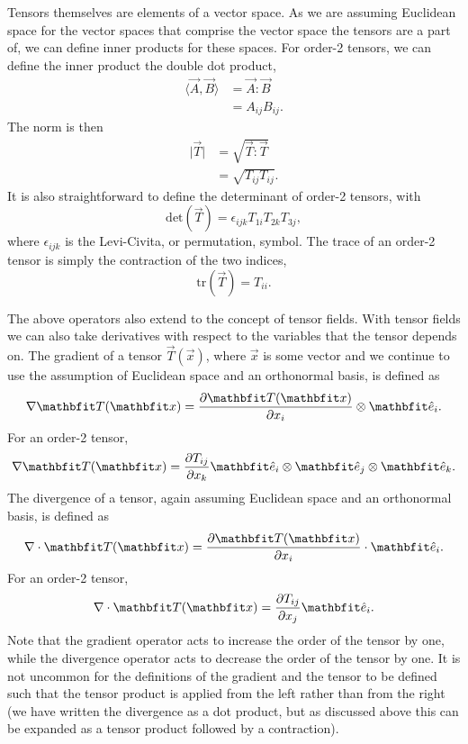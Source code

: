 Tensors themselves are elements of a vector space.
As we are assuming Euclidean space for the vector spaces that comprise the vector space the tensors are a part of, we can define inner products for these spaces.
For order-2 tensors, we can define the inner product the double dot product,
\begin{align}
    \langle \vec{A}, \vec{B} \rangle &= \vec{A} : \vec{B} \nonumber\\
                                     &= A_{ij} B_{ij}.
\end{align}
The norm is then
\begin{align}
    \lvert \vec{T} \rvert &= \sqrt{\vec{T} : \vec{T}} \nonumber\\
                          &= \sqrt{T_{ij} T_{ij}}.
\end{align}
It is also straightforward to define the determinant of order-2 tensors, with
\begin{equation}
    \textrm{det}(\vec{T}) = \epsilon_{ijk} T_{1i} T_{2k} T_{3j},
\end{equation}
where $\epsilon_{ijk}$ is the Levi-Civita, or permutation, symbol.
The trace of an order-2 tensor is simply the contraction of the two indices,
\begin{equation}
    \textrm{tr}(\vec{T}) = T_{ii}.
\end{equation}

The above operators also extend to the concept of tensor fields.
With tensor fields we can also take derivatives with respect to the variables that the tensor depends on.
The gradient of a tensor $\vec{T}(\vec{x})$, where $\vec{x}$ is some vector and we continue to use the assumption of Euclidean space and an orthonormal basis, is defined as
\begin{equation}
    \nabla \vec{T}(\vec{x}) = \frac{\partial \vec{T}(\vec{x})}{\partial x_{i}} \otimes \unitvec_{i}.
\end{equation}
For an order-2 tensor,
\begin{equation}
    \nabla \vec{T}(\vec{x}) = \frac{\partial T_{ij}}{\partial x_k} \unitvec_{i} \otimes \unitvec_{j} \otimes \unitvec_{k}.
\end{equation}
The divergence of a tensor, again assuming Euclidean space and an orthonormal basis, is defined as
\begin{equation}
    \nabla \cdot \vec{T}(\vec{x}) = \frac{\partial \vec{T}(\vec{x})}{\partial x_{i}} \cdot \unitvec_i.
\end{equation}
For an order-2 tensor,
\begin{equation}
    \nabla \cdot \vec{T}(\vec{x}) = \frac{\partial T_{ij}}{\partial x_j} \unitvec_{i}.
\end{equation}
Note that the gradient operator acts to increase the order of the tensor by one, while the divergence operator acts to decrease the order of the tensor by one.
It is not uncommon for the definitions of the gradient and the tensor to be defined such that the tensor product is applied from the left rather than from the right (we have written the divergence as a dot product, but as discussed above this can be expanded as a tensor product followed by a contraction).


